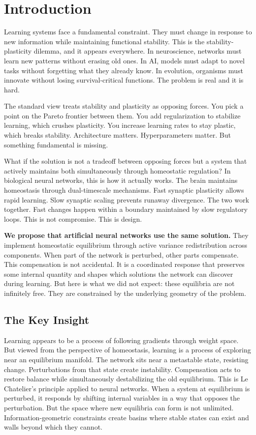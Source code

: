 \section{Introduction}\label{sec:intro}

Learning systems face a fundamental constraint. They must change in response to new information while maintaining functional stability. This is the stability-plasticity dilemma, and it appears everywhere. In neuroscience, networks must learn new patterns without erasing old ones. In AI, models must adapt to novel tasks without forgetting what they already know. In evolution, organisms must innovate without losing survival-critical functions. The problem is real and it is hard.

The standard view treats stability and plasticity as opposing forces. You pick a point on the Pareto frontier between them. You add regularization to stabilize learning, which crushes plasticity. You increase learning rates to stay plastic, which breaks stability. Architecture matters. Hyperparameters matter. But something fundamental is missing.

What if the solution is not a tradeoff between opposing forces but a system that actively maintains both simultaneously through homeostatic regulation? In biological neural networks, this is how it actually works. The brain maintains homeostasis through dual-timescale mechanisms. Fast synaptic plasticity allows rapid learning. Slow synaptic scaling prevents runaway divergence. The two work together. Fast changes happen within a boundary maintained by slow regulatory loops. This is not compromise. This is design.

\textbf{We propose that artificial neural networks use the same solution.} They implement homeostatic equilibrium through active variance redistribution across components. When part of the network is perturbed, other parts compensate. This compensation is not accidental. It is a coordinated response that preserves some internal quantity and shapes which solutions the network can discover during learning. But here is what we did not expect: these equilibria are not infinitely free. They are constrained by the underlying geometry of the problem.

\subsection{The Key Insight}

Learning appears to be a process of following gradients through weight space. But viewed from the perspective of homeostasis, learning is a process of exploring near an equilibrium manifold. The network sits near a metastable state, resisting change. Perturbations from that state create instability. Compensation acts to restore balance while simultaneously destabilizing the old equilibrium. This is Le Chatelier's principle applied to neural networks. When a system at equilibrium is perturbed, it responds by shifting internal variables in a way that opposes the perturbation. But the space where new equilibria can form is not unlimited. Information-geometric constraints create basins where stable states can exist and walls beyond which they cannot.

